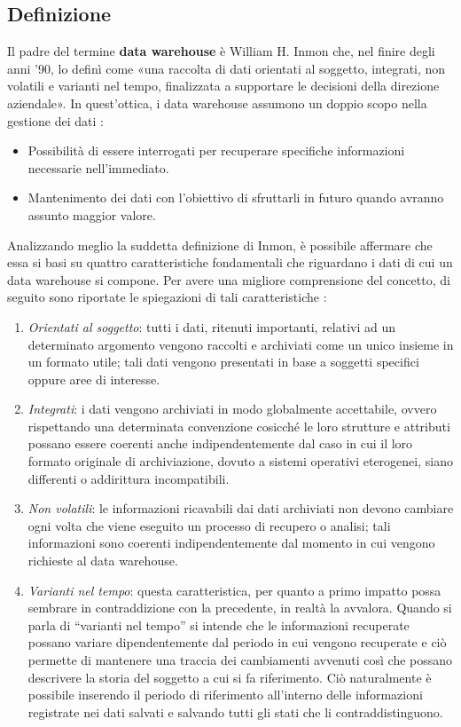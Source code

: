 \subsection{Definizione}

Il padre del termine \textbf{data warehouse} è William H. Inmon che, nel finire degli anni '90, lo definì come «una raccolta di dati orientati al soggetto, integrati, non volatili e varianti nel tempo, finalizzata a supportare le decisioni della direzione aziendale». In quest'ottica, i data warehouse assumono un doppio scopo nella gestione dei dati \cite{inmon_building_the_data_warehouse}:

\begin{itemize}
    \item Possibilità di essere interrogati per recuperare specifiche informazioni necessarie nell'immediato.
    \item Mantenimento dei dati con l'obiettivo di sfruttarli in futuro quando avranno assunto maggior valore.
\end{itemize}

Analizzando meglio la suddetta definizione di Inmon, è possibile affermare che essa si basi su quattro caratteristiche fondamentali che riguardano i dati di cui un data warehouse si compone. Per avere una migliore comprensione del concetto, di seguito sono riportate le spiegazioni di tali caratteristiche \cite{researchgate_data_warehouse_architecture}:

\begin{enumerate}
    \item \textit{Orientati al soggetto}: tutti i dati, ritenuti importanti, relativi ad un determinato argomento vengono raccolti e archiviati come un unico insieme in un formato utile; tali dati vengono presentati in base a soggetti specifici oppure aree di interesse.
    \item \textit{Integrati}: i dati vengono archiviati in modo globalmente accettabile, ovvero rispettando una determinata convenzione cosicché le loro strutture e attributi possano essere coerenti anche indipendentemente dal caso in cui il loro formato originale di archiviazione, dovuto a sistemi operativi eterogenei, siano differenti o addirittura incompatibili.
    \item \textit{Non volatili}: le informazioni ricavabili dai dati archiviati non devono cambiare ogni volta che viene eseguito un processo di recupero o analisi; tali informazioni sono coerenti indipendentemente dal momento in cui vengono richieste al data warehouse.
    \item \textit{Varianti nel tempo}: questa caratteristica, per quanto a primo impatto possa sembrare in contraddizione con la precedente, in realtà la avvalora. Quando si parla di “varianti nel tempo” si intende che le informazioni recuperate possano variare dipendentemente dal periodo in cui vengono recuperate e ciò permette di mantenere una traccia dei cambiamenti avvenuti così che possano descrivere la storia del soggetto a cui si fa riferimento. Ciò naturalmente è possibile inserendo il periodo di riferimento all'interno delle informazioni registrate nei dati salvati e salvando tutti gli stati che li contraddistinguono.
\end{enumerate}


